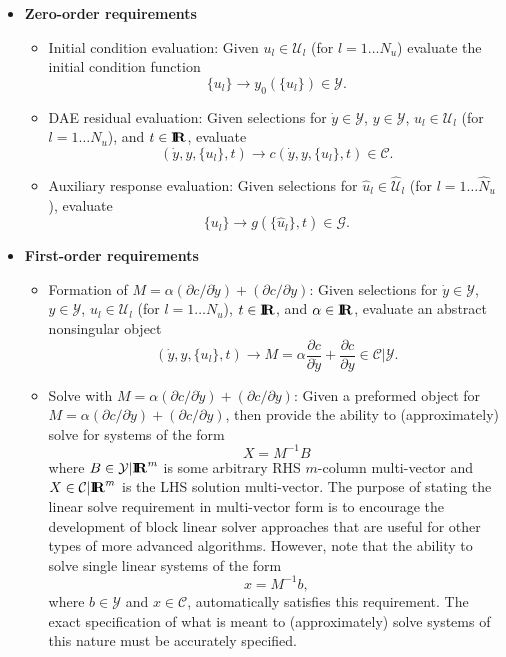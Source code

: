 \documentclass[pdf,ps2pdf,11pt]{SANDreport}
\begin{document}
\begin{itemize}

\item\textbf{Zero-order requirements}

\begin{itemize}
%
{}\item Initial condition evaluation: Given $u_l\in\mathcal{U}_l$ (for
$l=1\ldots{}N_u$) evaluate the initial condition function
\[
\{u_l\} {}\rightarrow y_0(\{u_l\})\in\mathcal{Y}.
\]
%
{}\item DAE residual evaluation: Given selections for $\dot{y}\in\mathcal{Y}$,
$y\in\mathcal{Y}$, $u_l\in\mathcal{U}_l$ (for $l=1\ldots{}N_u$), and
$t\in\mbox{\textbf{I}}\hspace{-0.6ex}\mbox{\textbf{R}}$, evaluate
\[
(\dot{y},y,\{u_l\},t) {}\rightarrow c(\dot{y},y,\{u_l\},t)\in\mathcal{C}.
\]
%
{}\item Auxiliary response evaluation: Given selections for
$\hat{u}_l\in\hat{\mathcal{U}}_l$ (for $l=1\ldots{}\hat{N}_u$), evaluate
\[
\{u_l\} {}\rightarrow g(\{\hat{u}_l\},t)\in\mathcal{G}.
\]
%
\end{itemize}

\item\textbf{First-order requirements}

\begin{itemize}
%
{}\item Formation of $M = {}\alpha ({}\partial c / {}\partial {}\dot{y}) +
({}\partial c / {}\partial y)$: Given selections for $\dot{y}\in\mathcal{Y}$,
$y\in\mathcal{Y}$, $u_l\in\mathcal{U}_l$ (for $l=1\ldots{}N_u$), $t\in\mbox{\textbf{I}}\hspace{-0.6ex}\mbox{\textbf{R}}$,
and $\alpha\in\mbox{\textbf{I}}\hspace{-0.6ex}\mbox{\textbf{R}}$, evaluate an abstract nonsingular object
\[
(\dot{y},y,\{u_l\},t) {}\rightarrow M
= {}\alpha \frac{\partial c}{\partial {}\dot{y}} + \frac{\partial c}{\partial y}
{}\in {}\mathcal{C}|\mathcal{Y}.
\]
%
{}\item Solve with $M = {}\alpha ({}\partial c / {}\partial {}\dot{y}) +
({}\partial c / {}\partial y)$: Given a preformed object for $M = {}\alpha
({}\partial c / {}\partial {}\dot{y}) + ({}\partial c / {}\partial y)$, then
provide the ability to (approximately) solve for systems of the form
\[
X = M^{-1} B
\]
where $B\in\mathcal{Y}|\mbox{\textbf{I}}\hspace{-0.6ex}\mbox{\textbf{R}}^m$ is some arbitrary RHS $m$-column multi-vector
and $X\in\mathcal{C}|\mbox{\textbf{I}}\hspace{-0.6ex}\mbox{\textbf{R}}^m$ is the LHS solution multi-vector.  The purpose of
stating the linear solve requirement in multi-vector form is to encourage the
development of block linear solver approaches that are useful for other types
of more advanced algorithms.  However, note that the ability to solve single
linear systems of the form
\[
x = M^{-1} b,
\]
where $b\in\mathcal{Y}$ and $x\in\mathcal{C}$, automatically satisfies this
requirement.  The exact specification of what is meant to (approximately) solve
systems of this nature must be accurately specified.
%
\end{itemize}

\end{itemize}
\end{document}
